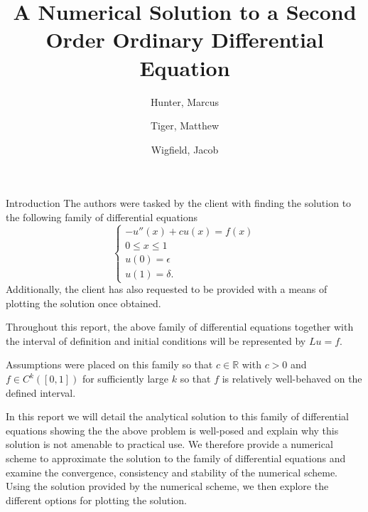 \documentclass{article}
\title{
	{A Numerical Solution to a Second Order Ordinary Differential Equation}\\
}
\author{
	Hunter, Marcus \\
	\and
	Tiger, Matthew \\
	\and
	Wigfield, Jacob \\
}
\begin{document}
\maketitle
\newpage


\tableofcontents
\newpage


\begin{section}{Introduction}
  The authors were tasked by the client with finding the solution to the following
  family of differential equations
  \[
  \begin{cases}
    -u''(x) + c u(x) = f(x) \\
    0 \leq x \leq 1 \\
    u(0) = \epsilon \\
    u(1) = \delta.
  \end{cases}
  \]
  Additionally, the client has also requested to be provided with a means of
  plotting the solution once obtained.

  Throughout this report, the above family of differential equations together with
  the interval of definition and initial conditions will be represented by
  $Lu = f$.

  Assumptions were placed on this family so that $c \in \mathbb{R}$ with $c > 0$
  and $f \in C^k([0,1])$ for sufficiently large $k$ so that $f$ is relatively
  well-behaved on the defined interval.

  In this report we will detail the analytical solution to this family of
  differential equations showing the the above problem is well-posed and
  explain why this solution is not amenable to practical use. We therefore
  provide a numerical scheme to approximate the solution to the family of
  differential equations and examine the convergence, consistency and stability
  of the numerical scheme. Using the solution provided by the numerical scheme,
  we then explore the different options for plotting the solution.
\end{section}
\end{document}
